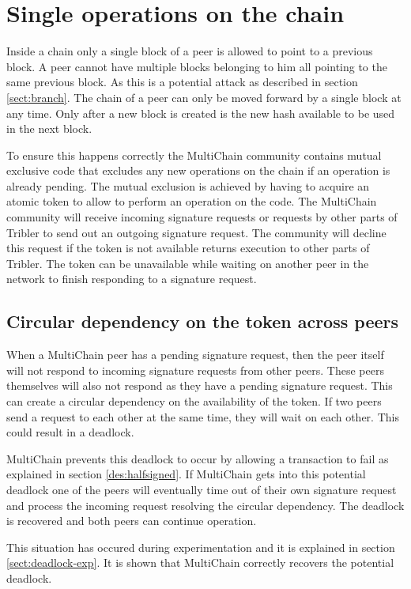 \section{Single operations on the chain}
\label{sect:deadlock}
Inside a chain only a single block of a peer is allowed to point to a previous block.
A peer cannot have multiple blocks belonging to him all pointing to the same previous block.
As this is a potential attack as described in section \ref{sect:branch}.
The chain of a peer can only be moved forward by a single block at any time.
Only after a new block is created is the new hash available to be used in the next block.

To ensure this happens correctly the MultiChain community contains mutual exclusive code
that excludes any new operations on the chain if an operation is already pending.
The mutual exclusion is achieved by having to acquire an atomic token to allow to perform an operation on the code.
The MultiChain community will receive incoming signature requests
or requests by other parts of Tribler to send out an outgoing signature request.
The community will decline this request if the token is not available
returns execution to other parts of Tribler.
The token can be unavailable while waiting on another peer in the network to finish responding to a signature request.

\subsection{Circular dependency on the token across peers}
When a MultiChain peer has a pending signature request,
then the peer itself will not respond to incoming signature requests from other peers.
These peers themselves will also not respond as they have a pending signature request.
This can create a circular dependency on the availability of the token.
If two peers send a request to each other at the same time, they will wait on each other.
This could result in a deadlock.

MultiChain prevents this deadlock to occur by allowing a transaction to fail
as explained in section \ref{des:halfsigned}.
If MultiChain gets into this potential deadlock one of the peers will eventually time out of their own signature request
and process the incoming request resolving the circular dependency.
The deadlock is recovered and both peers can continue operation.

This situation has occured during experimentation and it is explained in section \ref{sect:deadlock-exp}.
It is shown that MultiChain correctly recovers the potential deadlock.

